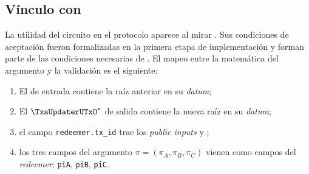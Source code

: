 \subsection{Vínculo con \TxsUpdaterMintingValidator}

La utilidad del circuito en el protocolo aparece al mirar \TxsUpdaterMintingValidator. Sus condiciones de aceptación fueron formalizadas en la primera etapa de implementación y forman parte de las condiciones necesarias de \MintTx. El mapeo entre la matemática del argumento \Groth y la validación \Onchain es el siguiente:

\begin{enumerate}[noitemsep]
  \item El \UTxO \TxsUpdaterUTxO de entrada contiene la raíz anterior \RootIn en su \textit{datum};
  \item El \UTxO $\TxsUpdaterUTxO^*$ de salida contiene la nueva raíz \RootOut en su \textit{datum};
  \item el campo \texttt{redeemer.tx\_id} trae los \textit{public inputs} \TxIdHi y \TxIdLo;
  \item los tres campos del argumento \Groth $\pi = (\pi_A, \pi_B, \pi_C)$ vienen como campos del \textit{redeemer}: \texttt{piA}, \texttt{piB}, \texttt{piC}.
\end{enumerate}
